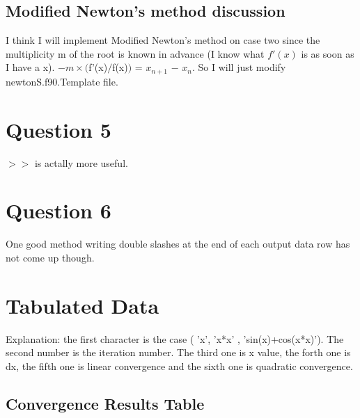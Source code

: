\documentclass[12pt]{article}
\begin{document}
\subsection{Modified Newton’s method discussion}
I think I will implement Modified Newton’s method on case two since
the multiplicity m of the root is known in advance (I know what $f'(x)$
is as soon as I have a x). $-$$m\times($f'(x)$/$f(x)$)$ = $x_{n+1}$ $-$ $x_{n}$. So I will just modify newtonS.f90.Template file.
\section{Question 5}
$>>$ is actally more useful.
\section{Question 6}
One good method writing double slashes at the end of each output data row has
not come up though.
\section {Tabulated Data}
Explanation: the first character is the case ( 'x', 'x*x' ,
'sin(x)+cos(x*x)'). The second number is the iteration number. The
third one is x value, the forth one is dx, the fifth one is linear
convergence and the sixth one is quadratic convergence.
\subsection{Convergence Results Table}
 
\begin{centering}
\begin{longtable}[h]
 
\hline
 \hline
  
 \hline
\hline

\end{longtable}
\end{centering}
\end{document}
